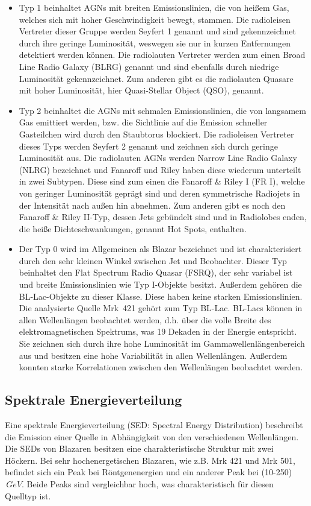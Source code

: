 \begin{itemize}
 \item Typ 1 beinhaltet AGNs mit breiten Emissionslinien, die von heißem Gas, welches sich mit hoher Geschwindigkeit bewegt, stammen.
 Die radioleisen Vertreter dieser Gruppe werden Seyfert 1 genannt und sind gekennzeichnet durch ihre geringe Luminosität, weswegen sie nur in kurzen Entfernungen detektiert werden können.
 Die radiolauten Vertreter werden zum einen Broad Line Radio Galaxy (BLRG) genannt und sind ebenfalls durch niedrige Luminosität gekennzeichnet. 
 Zum anderen gibt es die radiolauten Quasare mit hoher Luminosität, hier Quasi-Stellar Object (QSO), genannt.
 \item Typ 2 beinhaltet die AGNs mit schmalen Emissionslinien, die von langsamem Gas emittiert werden, bzw. die Sichtlinie auf die Emission schneller Gasteilchen wird durch den Staubtorus blockiert.
 Die radioleisen Vertreter dieses Typs werden Seyfert 2 genannt und zeichnen sich durch geringe Luminosität aus.
 Die radiolauten AGNs werden Narrow Line Radio Galaxy (NLRG) bezeichnet und Fanaroff und Riley haben diese wiederum unterteilt in zwei Subtypen.
 Diese sind zum einen die Fanaroff \& Riley I (FR I), welche von geringer Luminosität geprägt sind und deren symmetrische Radiojets in der Intensität nach außen hin abnehmen.
 Zum anderen gibt es noch den Fanaroff \& Riley II-Typ, dessen Jets gebündelt sind und in Radiolobes enden, die heiße Dichteschwankungen, genannt Hot Spots, enthalten.
 \item Der Typ 0 wird im Allgemeinen als Blazar bezeichnet und ist charakterisiert durch den sehr kleinen Winkel zwischen Jet und Beobachter.
 Dieser Typ beinhaltet den Flat Spectrum Radio Quasar (FSRQ), der sehr variabel ist und breite Emissionslinien wie Typ I-Objekte besitzt.
 Außerdem gehören die BL-Lac-Objekte zu dieser Klasse. Diese haben keine starken Emissionslinien.
 Die analysierte Quelle Mrk~421 gehört zum Typ BL-Lac.
 BL-Lacs können in allen Wellenlängen beobachtet werden, d.h. über die volle Breite des elektromagnetischen Spektrums, was 19 Dekaden in der Energie entspricht.
 Sie zeichnen sich durch ihre hohe Luminosität im Gammawellenlängenbereich aus und besitzen eine hohe Variabilität in allen Wellenlängen.
 Außerdem konnten starke Korrelationen zwischen den Wellenlängen beobachtet werden.
\end{itemize}


\subsection{Spektrale Energieverteilung}
Eine spektrale Energieverteilung (SED: Spectral Energy Distribution) beschreibt die Emission einer Quelle in Abhängigkeit von den verschiedenen Wellenlängen.
Die SEDs von Blazaren besitzen eine charakteristische Struktur mit zwei Höckern.
Bei sehr hochenergetischen Blazaren, wie z.B. Mrk 421 und Mrk 501, befindet sich ein Peak bei Röntgenenergien und ein anderer Peak bei (10-250)$\,\si{GeV}$.
Beide Peaks sind vergleichbar hoch, was charakteristisch für diesen Quelltyp ist.\cite{Weekes}



